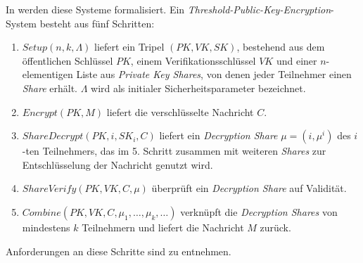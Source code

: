 In \cite{boneh2006} werden diese Systeme formalisiert. Ein \textit{Threshold-Public-Key-Encryption}-System besteht aus fünf Schritten: 
\begin{enumerate}
	\item \(Setup(n,k,\Lambda)\) liefert ein Tripel \((PK, VK, SK)\), bestehend aus dem öffentlichen Schlüssel \(PK\), einem Verifikationsschlüssel \(VK\) und einer \(n\)-elementigen Liste aus \textit{Private Key Shares}, von denen jeder Teilnehmer einen \textit{Share} erhält. \(\Lambda\) wird als initialer Sicherheitsparameter bezeichnet.
	\item \(Encrypt(PK, M)\) liefert die verschlüsselte Nachricht \(C\).
	\item \(ShareDecrypt(PK, i, SK_i, C)\) liefert ein \textit{Decryption Share} \(\mu=(i, \mu^i)\) des \(i\)-ten Teilnehmers, das im 5. Schritt zusammen mit weiteren \textit{Shares} zur Entschlüsselung der Nachricht genutzt wird. 
	\item \(ShareVerify(PK, VK, C, \mu)\) überprüft ein \textit{Decryption Share} auf Validität.
	\item \(Combine(PK, VK, C, {\mu_1, \dots,\mu_k, \dots})\) verknüpft die \textit{Decryption Shares} von mindestens \(k\) Teilnehmern und liefert die Nachricht \(M\) zurück.
\end{enumerate}
Anforderungen an diese Schritte sind \cite{boneh2006} zu entnehmen. 

